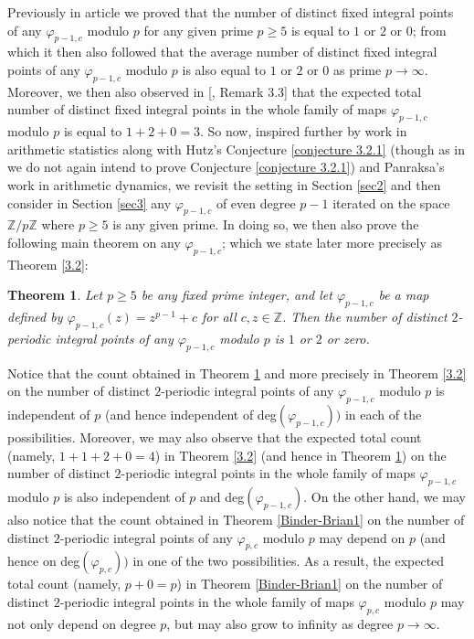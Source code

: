 \documentclass{article}
\theoremstyle{plain}
\newtheorem{thm}{Theorem}[section]
\theoremstyle{definition}
\begin{document}
Previously in article \cite{BK1} we proved that the number of distinct fixed integral points of any $\varphi_{p-1,c}$ modulo $p$ for any given prime $p \geq 5$ is equal to $1$ or $2$ or $0$; from which it then also followed that the average number of distinct fixed integral points of any $\varphi_{p-1,c}$ modulo $p$ is also equal to $1$ or $2$ or $0$ as prime $p\to \infty$. Moreover, we then also observed in [\cite{BK1}, Remark 3.3] that the expected total number of distinct fixed integral points in the whole family of maps $\varphi_{p-1,c}$ modulo $p$ is equal to $1 + 2+ 0 =3$. So now, inspired further by work in arithmetic statistics along with Hutz's Conjecture \ref{conjecture 3.2.1} (though as in \cite{BK1} we do not again intend to prove Conjecture \ref{conjecture 3.2.1}) and Panraksa's work \cite{par2} in arithmetic dynamics, we revisit the setting in Section \ref{sec2} and then consider in Section \ref{sec3} any $\varphi_{p-1,c}$ of even degree $p-1$ iterated on the space $\mathbb{Z}\slash p\mathbb{Z}$ where $p\geq 5$ is any given prime. In doing so, we then also prove the following main theorem on any $\varphi_{p-1,c}$; which we state later more precisely as Theorem \ref{3.2}:

\begin{thm}\label{Binder-Brian2}
Let $p\geq 5$ be any fixed prime integer, and let $\varphi_{p-1, c}$ be a map defined by $\varphi_{p-1, c}(z) = z^{p-1}+c$ for all $c, z\in\mathbb{Z}$. Then the number of distinct $2$-periodic integral points of any $\varphi_{p-1,c}$ modulo $p$ is $1$ or $2$ or zero.
\end{thm}

\noindent Notice that the count obtained in Theorem \ref{Binder-Brian2} and more precisely in Theorem \ref{3.2} on the number of distinct $2$-periodic integral points of any $\varphi_{p-1,c}$ modulo $p$ is independent of $p$ (and hence independent of deg$(\varphi_{p-1,c}))$ in each of the possibilities. Moreover, we may also observe that the expected total count (namely, $1+1+2+0 =4$) in Theorem \ref{3.2} (and hence in Theorem \ref{Binder-Brian2}) on the number of distinct $2$-periodic integral points in the whole family of maps $\varphi_{p-1,c}$ modulo $p$ is also independent of $p$ and deg$(\varphi_{p-1,c})$. On the other hand, we may also notice that the count obtained in Theorem \ref{Binder-Brian1} on the number of distinct $2$-periodic integral points of any $\varphi_{p,c}$ modulo $p$ may depend on $p$ (and hence on deg$(\varphi_{p,c}))$ in one of the two possibilities. As a result, the expected total count (namely, $p+0 =p$) in Theorem \ref{Binder-Brian1} on the number of distinct $2$-periodic integral points in the whole family of maps $\varphi_{p,c}$ modulo $p$ may not only depend on degree $p$, but may also grow to infinity as degree $p\to \infty$.
\end{document}
